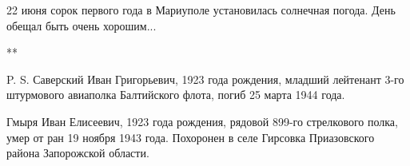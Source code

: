 22 июня сорок первого года в Мариуполе установилась солнечная погода. День
обещал быть очень хорошим...

**

P. S. Саверский Иван Григорьевич, 1923 года рождения, младший лейтенант 3-го
штурмового авиаполка Балтийского флота, погиб 25 марта 1944 года.

Гмыря Иван Елисеевич, 1923 года рождения, рядовой 899-го стрелкового полка,
умер от ран 19 ноября 1943 года. Похоронен в селе Гирсовка Приазовского района
Запорожской области.
